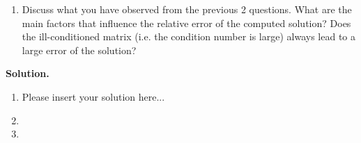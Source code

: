 \documentclass[english,onecolumn]{IEEEtran}
\begin{document}
\begin{enumerate}
    
    \item Discuss what you have observed from the previous 2 questions. What are the main factors that influence the relative error of the computed solution? Does the ill-conditioned matrix (i.e. the condition number is large) always lead to a large error of the solution?     
\end{enumerate}

\noindent\textbf{Solution.}
\begin{enumerate}
    \item Please insert your solution here...
    \item 
    \item
\end{enumerate}
\end{document}
